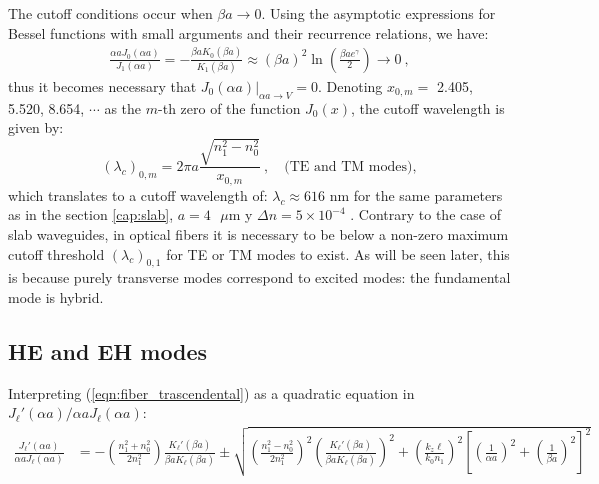 The cutoff conditions occur when $\beta a \to 0$. Using the asymptotic expressions for Bessel functions with small arguments and their recurrence relations, we have:
\begin{align*}
	\frac{\alpha a J_0(\alpha a)}{J_1(\alpha a)}  = -\frac{\beta a K_{0}(\beta a)} {K_1(\beta a)} \approx (\beta a)^2\ln\left(\frac{\beta a e^\gamma}{2}\right) \to 0 \ ,
\end{align*}
thus it becomes necessary that $\left. J_0(\alpha a)\right|_{\alpha a \to V} = 0$. Denoting $x_{0,m}=$ 2.405,  5.520,  8.654, $\cdots$ as the  $m$-th zero of the function $J_0(x)$, the cutoff wavelength is given by:
\begin{equation}
(\lambda_c)_{0,m} = 2\pi a \frac{\sqrt{n_1^2 - n_0^2}}{x_{0,m}} \ , \quad\text{(TE and TM modes)},
\end{equation} 
which translates to a cutoff wavelength of: $\lambda_c\approx 616$ nm for the same parameters as in the section \ref{cap:slab}, $a=4 \text{ }\mu$m y $\Delta n = 5\times 10^{-4}$ . Contrary to the case of slab waveguides, in optical fibers it is necessary to be below a non-zero maximum cutoff threshold $(\lambda_c)_{0,1}$ for TE or TM modes to exist. As will be seen later, this is because purely transverse modes correspond to excited modes: the fundamental mode is hybrid.



\subsection{HE and EH modes}
Interpreting (\ref{eqn:fiber_trascendental}) as a quadratic equation in $J_\ell'(\alpha a)/\alpha a J_\ell(\alpha a)$:
\begin{align*}
	\frac{J_\ell'(\alpha a)}{\alpha a J_\ell(\alpha a)} &= -\left(\frac{n_1^2+n_0^2}{2n_1^2}\right) \frac{K_\ell'(\beta a)}{\beta a K_\ell(\beta a)}\pm\sqrt{\left(\frac{n_1^2-n_0^2}{2n_1^2}\right)^2\left(\frac{K_\ell'(\beta a)}{\beta a K_\ell(\beta a)}\right)^2+ \left( \frac{ k_z \ell}{ k_0 n_1} \right)^2\left[ \left(\frac{1}{\alpha a}\right)^2 + \left(\frac{1}{\beta a}\right)^2 \right]^2 }
\end{align*}

